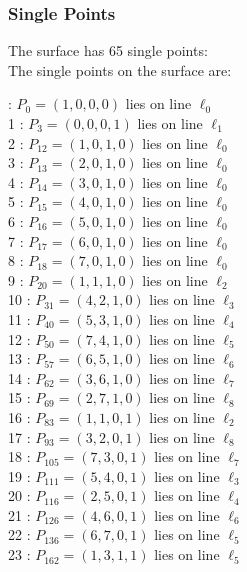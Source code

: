 \documentclass{article}
\begin{document}
{\subsubsection*{Single Points}
The surface has 65 single points:\\
The single points on the surface are:\\
\begin{multicols}{2}
 : $P_{0}=( 1, 0, 0, 0 )$ lies on line $\ell_{0}$\\
1 : $P_{3}=( 0, 0, 0, 1 )$ lies on line $\ell_{1}$\\
2 : $P_{12}=( 1, 0, 1, 0 )$ lies on line $\ell_{0}$\\
3 : $P_{13}=( 2, 0, 1, 0 )$ lies on line $\ell_{0}$\\
4 : $P_{14}=( 3, 0, 1, 0 )$ lies on line $\ell_{0}$\\
5 : $P_{15}=( 4, 0, 1, 0 )$ lies on line $\ell_{0}$\\
6 : $P_{16}=( 5, 0, 1, 0 )$ lies on line $\ell_{0}$\\
7 : $P_{17}=( 6, 0, 1, 0 )$ lies on line $\ell_{0}$\\
8 : $P_{18}=( 7, 0, 1, 0 )$ lies on line $\ell_{0}$\\
9 : $P_{20}=( 1, 1, 1, 0 )$ lies on line $\ell_{2}$\\
10 : $P_{31}=( 4, 2, 1, 0 )$ lies on line $\ell_{3}$\\
11 : $P_{40}=( 5, 3, 1, 0 )$ lies on line $\ell_{4}$\\
12 : $P_{50}=( 7, 4, 1, 0 )$ lies on line $\ell_{5}$\\
13 : $P_{57}=( 6, 5, 1, 0 )$ lies on line $\ell_{6}$\\
14 : $P_{62}=( 3, 6, 1, 0 )$ lies on line $\ell_{7}$\\
15 : $P_{69}=( 2, 7, 1, 0 )$ lies on line $\ell_{8}$\\
16 : $P_{83}=( 1, 1, 0, 1 )$ lies on line $\ell_{2}$\\
17 : $P_{93}=( 3, 2, 0, 1 )$ lies on line $\ell_{8}$\\
18 : $P_{105}=( 7, 3, 0, 1 )$ lies on line $\ell_{7}$\\
19 : $P_{111}=( 5, 4, 0, 1 )$ lies on line $\ell_{3}$\\
20 : $P_{116}=( 2, 5, 0, 1 )$ lies on line $\ell_{4}$\\
21 : $P_{126}=( 4, 6, 0, 1 )$ lies on line $\ell_{6}$\\
22 : $P_{136}=( 6, 7, 0, 1 )$ lies on line $\ell_{5}$\\
23 : $P_{162}=( 1, 3, 1, 1 )$ lies on line $\ell_{5}$\\

\end{multicols}}
\end{document}
